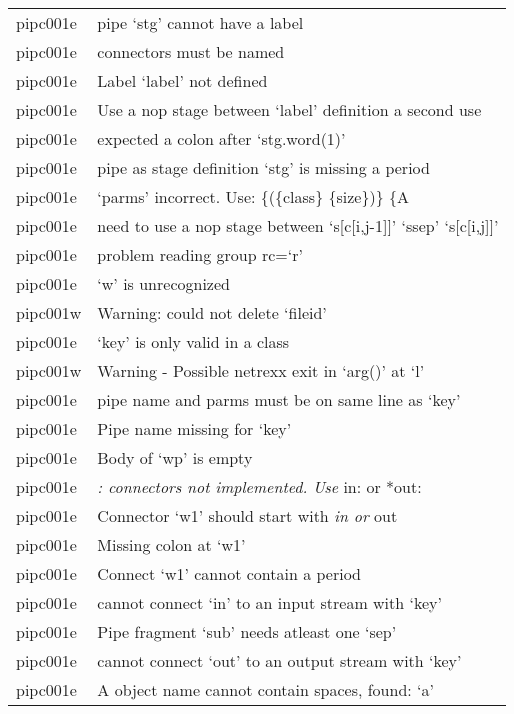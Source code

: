 \begin{longtable}[]{@{}
  >{\raggedright\arraybackslash}p{}
  >{\raggedright\arraybackslash}p{}@{}}
pipc001e & pipe `stg' cannot have a label \\
pipc001e & connectors must be named \\
pipc001e & Label `label' not defined \\
pipc001e & Use a nop stage between `label' definition a second use \\
pipc001e & expected a colon after `stg.word(1)' \\
pipc001e & pipe as stage definition `stg' is missing a period \\
pipc001e & `parms' incorrect. Use: \{(\{class\} \{size\})\} \{A \\
pipc001e & need to use a nop stage between `s{[}c{[}i,j-1{]}{]}' `ssep'
`s{[}c{[}i,j{]}{]}' \\
pipc001e & problem reading group rc=`r' \\
pipc001e & `w' is unrecognized \\
pipc001w & Warning: could not delete `fileid' \\
pipc001e & `key' is only valid in a class \\
pipc001w & Warning - Possible netrexx exit in `arg()' at `l' \\
pipc001e & pipe name and parms must be on same line as `key' \\
pipc001e & Pipe name missing for `key' \\
pipc001e & Body of `wp' is empty \\
pipc001e & \emph{: connectors not implemented. Use }in: or *out: \\
pipc001e & Connector `w1' should start with \emph{in or }out \\
pipc001e & Missing colon at `w1' \\
pipc001e & Connect `w1' cannot contain a period \\
pipc001e & cannot connect `in' to an input stream with `key' \\
pipc001e & Pipe fragment `sub' needs atleast one `sep' \\
pipc001e & cannot connect `out' to an output stream with `key' \\
pipc001e & A object name cannot contain spaces, found: `a' \\
\end{longtable}
